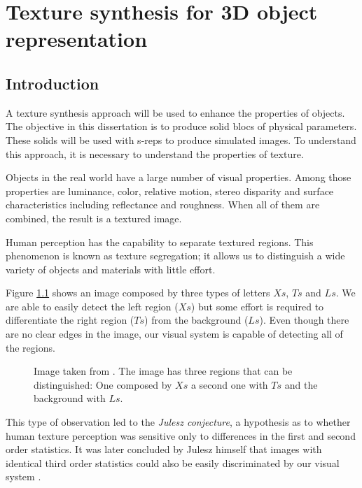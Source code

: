 
\graphicspath{{ChapterTexture/images/}}
\chapter{Texture synthesis for 3D object representation}
\label{chapter:textureSynthesis}

\section{Introduction}

A texture synthesis approach will be used to enhance the properties of objects. 
The objective in this dissertation is to produce solid blocs of physical parameters. 
These solids will be used with s-reps to produce simulated images.
To understand this approach, it is necessary to 
understand the properties of texture.

Objects in the real world have a large number of visual properties.
Among those properties are luminance, color, relative motion, stereo disparity
and surface characteristics including reflectance and roughness.
When all of them are combined, the result is a textured image. 

Human perception has the capability to separate textured regions.
This phenomenon is known as texture segregation;
it allows us to distinguish a wide variety of objects and materials with little effort.

Figure \ref{fig:textureSegregation} shows an image composed by 
three types of letters $Xs$, $Ts$ and $Ls$. We are able to easily detect
the left region ($Xs$) but some effort is required to differentiate
the right region ($Ts$) from the background ($Ls$). 
Even though there are no clear edges in the image, our visual 
system is capable of detecting all of the regions.
\begin{figure}
  \centering
  \caption[Texture segregation.]{Image taken from \cite{bergen1991computational}. 
	   The image has three regions that can be distinguished: 
	   One composed by $Xs$ a second one with $Ts$ and the background with $Ls$.}
 \label{fig:textureSegregation}  
\end{figure}

This type of observation led to the \textit{Julesz conjecture}, a hypothesis 
as to whether human texture perception was sensitive only to differences 
in the first %
and second order statistics. %
It was later concluded by Julesz himself that images with identical third order statistics 
could also be easily discriminated by our visual system \cite{julesz1978visual}. 

